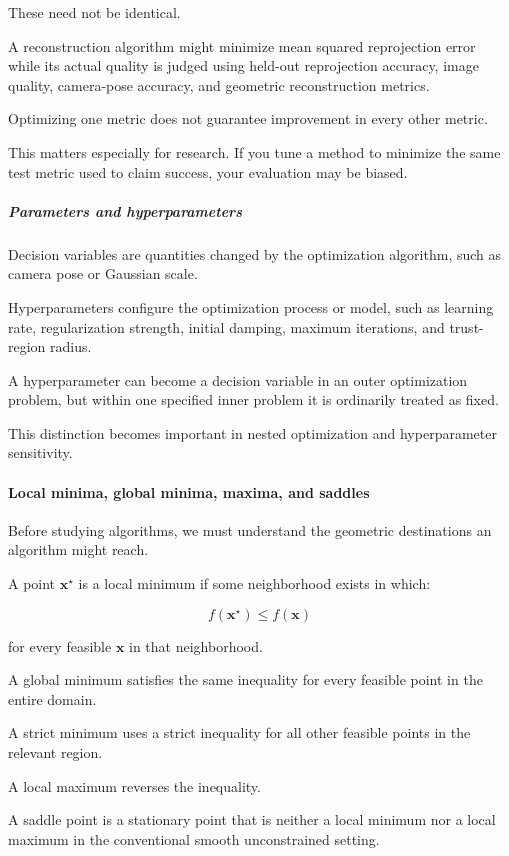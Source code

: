 These need not be identical.

A reconstruction algorithm might minimize mean squared reprojection error while its actual quality is judged using held-out reprojection accuracy, image quality, camera-pose accuracy, and geometric reconstruction metrics.

Optimizing one metric does not guarantee improvement in every other metric.

This matters especially for research. If you tune a method to minimize the same test metric used to claim success, your evaluation may be biased.

\subparagraph{Parameters and hyperparameters}\label{parameters-and-hyperparameters}

Decision variables are quantities changed by the optimization algorithm, such as camera pose or Gaussian scale.

Hyperparameters configure the optimization process or model, such as learning rate, regularization strength, initial damping, maximum iterations, and trust-region radius.

A hyperparameter can become a decision variable in an outer optimization problem, but within one specified inner problem it is ordinarily treated as fixed.

This distinction becomes important in nested optimization and hyperparameter sensitivity.

\paragraph{Local minima, global minima, maxima, and saddles}\label{local-minima-global-minima-maxima-and-saddles}

Before studying algorithms, we must understand the geometric destinations an algorithm might reach.

A point \(\mathbf x^\star\) is a local minimum if some neighborhood exists in which:

\[
f(\mathbf x^\star)\le f(\mathbf x)
\]

for every feasible \(\mathbf x\) in that neighborhood.

A global minimum satisfies the same inequality for every feasible point in the entire domain.

A strict minimum uses a strict inequality for all other feasible points in the relevant region.

A local maximum reverses the inequality.

A saddle point is a stationary point that is neither a local minimum nor a local maximum in the conventional smooth unconstrained setting.


